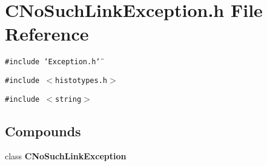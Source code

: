\section{CNo\-Such\-Link\-Exception.h File Reference}
\label{CNoSuchLinkException_8h}
{\tt \#include \char`\"{}Exception.h\char`\"{}}\par
{\tt \#include $<$histotypes.h$>$}\par
{\tt \#include $<$string$>$}\par
\subsection*{Compounds}
\begin{CompactItemize}
\item 
class {\bf CNo\-Such\-Link\-Exception}
\end{CompactItemize}
